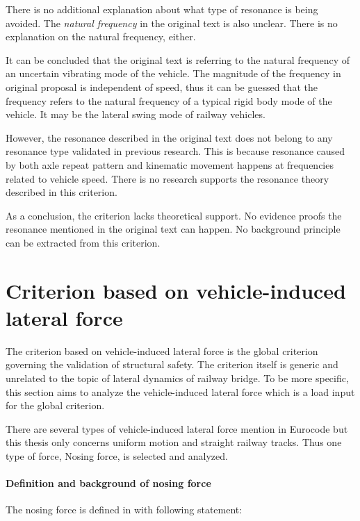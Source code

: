 There is no additional explanation about what type of resonance is being avoided. The \emph{natural frequency} in the original text is also unclear. There is no explanation on the natural frequency, either.  

It can be concluded that the original text is referring to the natural frequency of an uncertain vibrating mode of the vehicle. The magnitude of the frequency in original proposal is independent of speed, thus it can be guessed that the frequency refers to the natural frequency of a typical rigid body mode of the vehicle. It may be the lateral swing mode of railway vehicles.

However, the resonance described in the original text does not belong to any resonance type validated in previous research. This is because resonance caused by both axle repeat pattern and kinematic movement happens at frequencies related to vehicle speed. There is no research supports the resonance theory described in this criterion.

As a conclusion, the criterion lacks theoretical support. No evidence proofs the resonance mentioned in the original text can happen.  No background principle can be extracted from this criterion.

\section{Criterion based on vehicle-induced lateral force}
The criterion based on vehicle-induced lateral force is the global criterion governing the validation of structural safety. The criterion itself is generic and unrelated to the topic of lateral dynamics of railway bridge. To be more specific, this section aims to analyze the vehicle-induced lateral force which is a load input for the global criterion.

There are several types of vehicle-induced lateral force mention in Eurocode\citep{EC12} but this thesis only concerns uniform motion and straight railway tracks. Thus one type of force, Nosing force, is selected and analyzed. 

\paragraph{Definition and background of nosing force} 
The nosing force is defined in \citep[6.5.2]{EC12} with following statement:

